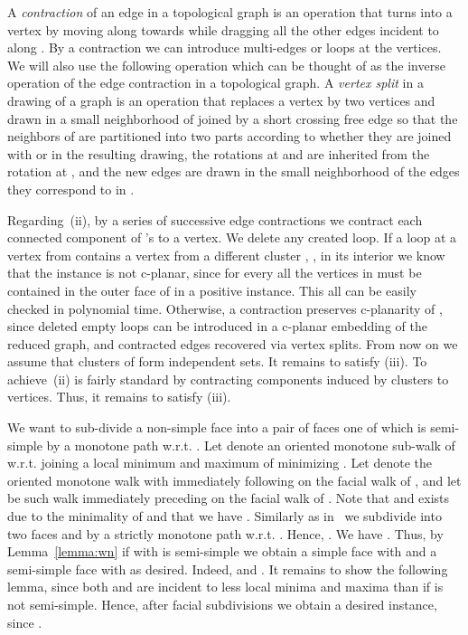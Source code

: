 \documentclass{llncs}
\begin{document}
A \emph{contraction} of an  edge  in a topological graph is an operation that turns
 into a vertex
by moving  along  towards  while dragging all the other edges incident to  along .
By a contraction we can introduce multi-edges or loops at the vertices.
We will also  use the following operation which can be thought of as the inverse operation of the edge contraction
in a topological graph.
A \emph{vertex split} in a drawing of a graph  is an operation that replaces a vertex  by two vertices  and 
drawn in a small neighborhood of  joined by a short crossing free edge so that the neighbors of  are partitioned into two parts
according to whether they are joined with  or  in the resulting drawing, the rotations at  and  are inherited from the
rotation at , and the new edges are drawn in the small  neighborhood of the edges they correspond to in .



Regarding~(ii), by a series of successive edge contractions we contract each connected component of 's to a vertex.
We delete any created loop.
If a loop at a vertex from  contains a vertex from a different cluster , , in its interior we know that the 
instance is not c-planar, since for every  all the vertices in  must be contained in the outer face of  in a positive instance. This all can be easily checked in  polynomial time.
Otherwise, a contraction preserves c-planarity of , since
deleted empty loops can be introduced in a c-planar embedding of the reduced graph,
and contracted edges recovered via vertex splits.
From now on we assume that clusters of  form independent sets. 
It remains to satisfy (iii).
\else
To achieve~(ii) is fairly standard by contracting components induced by clusters to vertices. \fi
Thus, it remains to satisfy (iii).


We want to sub-divide a non-simple face   into 
a pair of faces one of which is
semi-simple by a monotone path  w.r.t. .
Let  denote an oriented monotone  sub-walk of  w.r.t.  joining a local minimum  and maximum  of  minimizing  .
Let  denote the oriented  monotone walk with  immediately following  on the facial walk of , and let  be such walk  immediately preceding  on the facial walk of . Note that  and  exists due to the minimality of  and that we have
.
Similarly as in~\cite{F14+} we subdivide  into two faces  and 
by a strictly monotone path   w.r.t. . Hence,  .
We have .
Thus, by Lemma~\ref{lemma:wn} if  with  is semi-simple we obtain a simple face  with 
 and a semi-simple face  with  as desired.
Indeed, 
and . It remains to show the following lemma, since both  and  
are incident to less local minima and maxima than  if  is not semi-simple.
Hence, after  facial subdivisions we obtain a desired instance, since .
\end{document}
